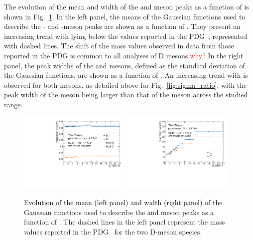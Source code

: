 The evolution of the mean and width of the \ds and \dpl meson peaks as a function of \pt is shown in Fig.~\ref{fig:mean_width}. In the left panel, the means of the Gaussian functions used to describe the \ds- and \dpl-meson peaks are shown as a function of \pt. They present an increasing trend with \pt lying below the values reported in the PDG~\cite{pdg}, represented with dashed lines. The shift of the mass values observed in data from those reported in the PDG is common to all analyses of D mesons.\textcolor{red}{why?} In the right panel, the peak widths of the \ds and \dpl mesons, defined as the standard deviation of the Gaussian functions, are shown as a function of \pt. An increasing trend with \pt is observed for both mesons, as detailed above for Fig.~\ref{fig:sigma_ratio}, with the peak width of the \ds meson being larger than that of the \dpl meson across the studied \pt range.

\begin{figure}[htb]
    \centering
    \includegraphics[width=0.48\textwidth]{Figures/Chapter 5/Mean.pdf}
    \includegraphics[width=0.48\textwidth]{Figures/Chapter 5/Sigma.pdf}
    \caption{Evolution of the mean (left panel) and width (right panel) of the Gaussian functions used to describe the \ds and \dpl meson peaks as a function of \pt. The dashed lines in the left panel represent the mass values reported in the PDG~\cite{pdg} for the two D-meson species.}
    \label{fig:mean_width}
\end{figure}

